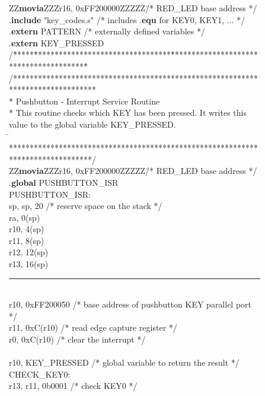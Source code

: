 \begin{figure}[h!]
\begin{center}
\begin{minipage}[t]{12.5 cm}
\begin{tabbing}
ZZ\={\bf movia}ZZZ\=r16, 0xFF200000ZZZZZ\=/* RED\_LED base address */\kill
.{\bf include} \>\>"key\_codes.s" \>/* includes .{\bf equ} for KEY0, KEY1, $\ldots$ */\\
.{\bf extern} \>\>PATTERN \>/* externally defined variables */\\
.{\bf extern} \>\>KEY\_PRESSED\\
/\=*****\=*********************************\=****************************************\=\kill
/********************************************************************************\\
\>* Pushbutton - Interrupt Service Routine                                \\
\>* This routine checks which KEY has been pressed. It writes this value to the global variable KEY\_PRESSED. \\
\=\kill
\>********************************************************************************/\\
ZZ\={\bf movia}ZZZ\=r16, 0xFF200000ZZZZZ\=/* RED\_LED base address */\kill
\>.{\bf global} \>PUSHBUTTON\_ISR\\
PUSHBUTTON\_ISR:\\
 \>sp, sp, 20 \>/* reserve space on the stack */\\
 \>ra, 0(sp)\\
 \>r10, 4(sp)\\
 \>r11, 8(sp)\\
 \>r12, 12(sp)\\
 \>r13, 16(sp)\\
\rule{6.0in}{0in}~\\
 \>r10, 0xFF200050 \>/* base address of pushbutton KEY parallel port */\\
 \>r11, 0xC(r10) \>/* read edge capture register */\\
 \>r0,  0xC(r10) \>/* clear the interrupt */                  \\
~\\
 \>r10, KEY\_PRESSED \>/* global variable to return the result */\\
CHECK\_KEY0:\\
 \>r13, r11, 0b0001 \>/* check KEY0 */\\

\end{tabbing}
\end{minipage}
\end{center}
\end{figure}
